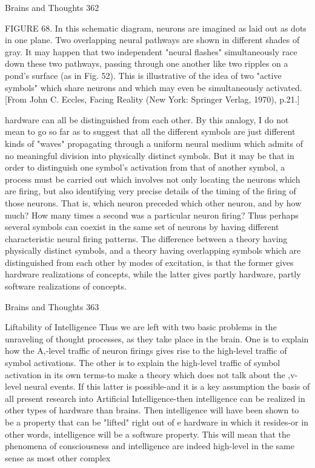 Brains and Thoughts                                                                      362

FIGURE 68. In this schematic diagram, neurons are imagined as laid out as dots in one plane.
Two overlapping neural pathways are shown in different shades of gray. It may happen that two
independent "neural flashes" simultaneously race down these two pathways, passing through one
another like two ripples on a pond's surface (as in Fig. 52). This is illustrative of the idea of two
"active symbols" which share neurons and which may even be simultaneously activated. [From
John C. Eccles, Facing Reality (New York: Springer Verlag, 1970), p.21.]

hardware can all be distinguished from each other. By this analogy, I do not mean to go
so far as to suggest that all the different symbols are just different kinds of "waves"
propagating through a uniform neural medium which admits of no meaningful division
into physically distinct symbols. But it may be that in order to distinguish one symbol's
activation from that of another symbol, a process must be carried out which involves not
only locating the neurons which are firing, but also identifying very precise details of the
timing of the firing of those neurons. That is, which neuron preceded which other neuron,
and by how much? How many times a second was a particular neuron firing? Thus
perhaps several symbols can coexist in the same set of neurons by having different
characteristic neural firing patterns. The difference between a theory having physically
distinct symbols, and a theory having overlapping symbols which are distinguished from
each other by modes of excitation, is that the former gives hardware realizations of
concepts, while the latter gives partly hardware, partly software realizations of concepts.




Brains and Thoughts                                                                             363

                                Liftability of Intelligence
Thus we are left with two basic problems in the unraveling of thought processes, as they
take place in the brain. One is to explain how the A,-level traffic of neuron firings gives
rise to the high-level traffic of symbol activations. The other is to explain the high-level
traffic of symbol activation in its own terms-to make a theory which does not talk about
the ,v-level neural events. If this latter is possible-and it is a key assumption the basis of
all present research into Artificial Intelligence-then intelligence can be realized in other
types of hardware than brains. Then intelligence will have been shown to be a property
that can be "lifted" right out of e hardware in which it resides-or in other words,
intelligence will be a software property. This will mean that the phenomena of
consciousness and intelligence are indeed high-level in the same sense as most other
complex

